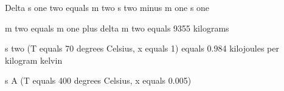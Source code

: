 Delta s one two equals m two s two minus m one s one  

m two equals m one plus delta m two equals 9355 kilograms  

s two (T equals 70 degrees Celsius, x equals 1) equals 0.984 kilojoules per kilogram kelvin  

s A (T equals 400 degrees Celsius, x equals 0.005)